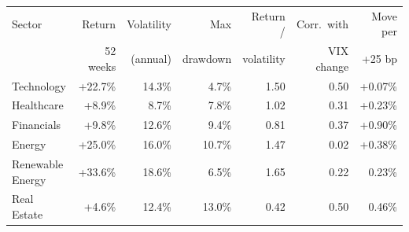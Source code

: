 \begin{tabular}{@{}lrrrrrr@{}}
\toprule
Sector & Return & Volatility & Max & Return / & Corr.\ with & Move per \\
       & 52 weeks & (annual) & drawdown & volatility & VIX change & +25 bp \\
\midrule
Technology & +22.7\% & 14.3\% & \textminus{}4.7\% & 1.50 & \textminus{}0.50 & +0.07\% \\
Healthcare & +8.9\% & 8.7\% & \textminus{}7.8\% & 1.02 & \textminus{}0.31 & +0.23\% \\
Financials & +9.8\% & 12.6\% & \textminus{}9.4\% & 0.81 & \textminus{}0.37 & +0.90\% \\
Energy & +25.0\% & 16.0\% & \textminus{}10.7\% & 1.47 & \textminus{}0.02 & +0.38\% \\
Renewable Energy & +33.6\% & 18.6\% & \textminus{}6.5\% & 1.65 & \textminus{}0.22 & \textminus{}0.23\% \\
Real Estate & +4.6\% & 12.4\% & \textminus{}13.0\% & 0.42 & \textminus{}0.50 & \textminus{}0.46\% \\
\bottomrule
\end{tabular}